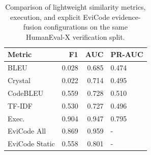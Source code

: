 \begin{table}[!htbp]
\centering
\scriptsize
\begin{tabular}{lrrl}
\toprule
Metric & F1 & AUC & PR-AUC \\
\midrule
BLEU & 0.028 & 0.685 & 0.474 \\
Crystal & 0.022 & 0.714 & 0.495 \\
CodeBLEU & 0.559 & 0.728 & 0.510 \\
TF-IDF & 0.530 & 0.727 & 0.496 \\
Exec. & 0.904 & 0.947 & 0.795 \\
EviCode All & 0.869 & 0.959 & - \\
EviCode Static & 0.558 & 0.801 & - \\
\bottomrule
\end{tabular}
\vspace{0.5em}
\caption{Comparison of lightweight similarity metrics, execution, and explicit EviCode evidence-fusion configurations on the same HumanEval-X verification split.}
\label{tab:metric-comparison}
\end{table}
